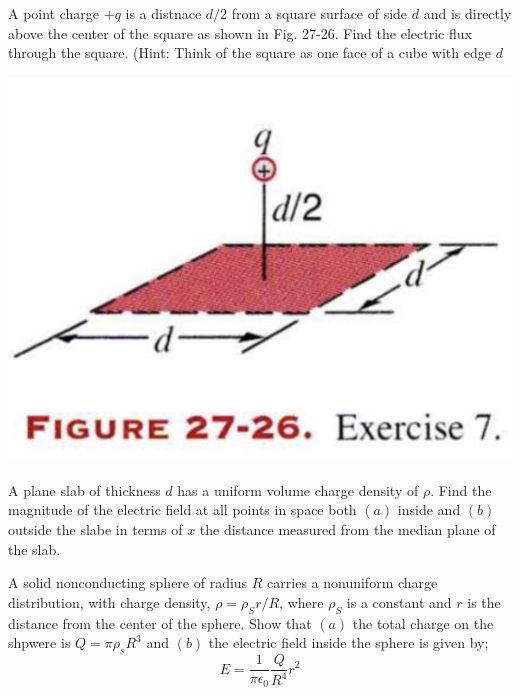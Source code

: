 \documentclass[11pt,letterpaper,boxed]{hmcpset}
\begin{document}
\begin{solution}
\vfill
\end{solution}
\newpage

\begin{problem}[HRK P27.7]
A point charge $+q$ is a distnace $d/2$ from a square surface of side $d$ and is directly above the center of the square as shown in Fig. 27-26. Find the electric flux through the square. (Hint: Think of the square as one face of a cube with edge $d$ 
\begin{center}
\includegraphics[scale=0.6]{27-26.png}
\end{center} 

\end{problem}

\begin{solution}
\vfill
\end{solution}
\newpage

\begin{problem}[HRK P27.16	]
A plane slab of thickness $d$ has a uniform volume charge density of $\rho$. Find the magnitude of the electric field at all points in space both $(a)$ inside and $(b)$ outside the slabe in terms of $x$ the distance measured from the median plane of the slab. 
\end{problem}

\begin{solution}
\vfill
\end{solution}
\newpage

\begin{problem}[HRK P27.17]
A solid nonconducting sphere of radius $R$ carries a nonuniform charge distribution, with charge density, $\rho= \rho_Sr/R$, where $\rho_S$ is a constant and $r$ is the distance from the center of the sphere. Show that $(a)$ the total charge on the shpwere is $Q= \pi \rho_sR^3$ and $(b)$ the electric field inside the sphere is given by; 
$$ E = \frac{1}{\pi \epsilon_0}\frac{Q}{R^4}r^2$$
\end{problem}
\end{document}

